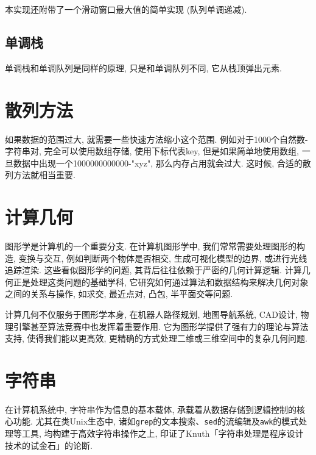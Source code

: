 \documentclass[a4paper]{ctexbook}
\begin{document}
本实现还附带了一个滑动窗口最大值的简单实现 (队列单调递减).



\section{单调栈}

单调栈和单调队列是同样的原理, 只是和单调队列不同, 它从栈顶弹出元素.



\chapter{散列方法}

如果数据的范围过大, 就需要一些快速方法缩小这个范围. 例如对于1000个自然数-字符串对, 完全可以使用数组存储, 使用下标代表key, 但是如果简单地使用数组, 一旦数据中出现一个1000000000000-"xyz", 那么内存占用就会过大. 这时候, 合适的散列方法就相当重要.



\chapter{计算几何}

图形学是计算机的一个重要分支. 在计算机图形学中, 我们常常需要处理图形的构造, 变换与交互, 例如判断两个物体是否相交, 生成可视化模型的边界, 或进行光线追踪渲染. 这些看似图形学的问题, 其背后往往依赖于严密的几何计算逻辑. 计算几何正是处理这类问题的基础学科, 它研究如何通过算法和数据结构来解决几何对象之间的关系与操作, 如求交, 最近点对, 凸包, 半平面交等问题.

计算几何不仅服务于图形学本身, 在机器人路径规划, 地图导航系统, CAD设计, 物理引擎甚至算法竞赛中也发挥着重要作用. 它为图形学提供了强有力的理论与算法支持, 使得我们能以更高效, 更精确的方式处理二维或三维空间中的复杂几何问题.



\chapter{字符串}

在计算机系统中, 字符串作为信息的基本载体, 承载着从数据存储到逻辑控制的核心功能. 尤其在类Unix生态中, 诸如\texttt{grep}的文本搜索、\texttt{sed}的流编辑及\texttt{awk}的模式处理等工具, 均构建于高效字符串操作之上, 印证了Knuth「字符串处理是程序设计技术的试金石」的论断.
\end{document}
